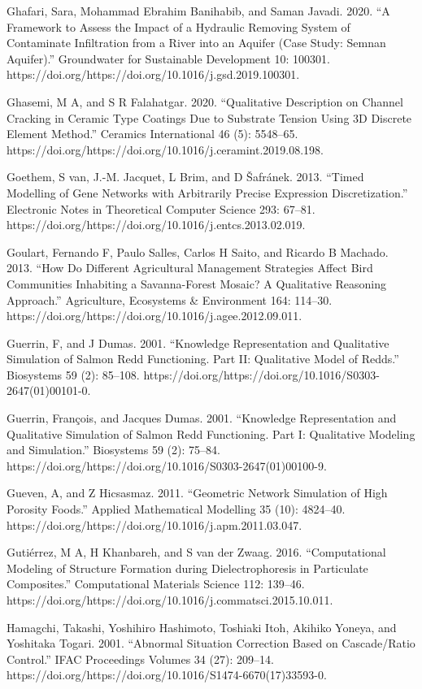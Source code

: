 \documentclass[utf8]{gradu3}
\begin{document}
Ghafari, Sara, Mohammad Ebrahim Banihabib, and Saman Javadi. 2020. “A Framework to Assess the Impact of a Hydraulic Removing System of Contaminate Infiltration from a River into an Aquifer (Case Study: Semnan Aquifer).” Groundwater for Sustainable Development 10: 100301. https://doi.org/https://doi.org/10.1016/j.gsd.2019.100301.

Ghasemi, M A, and S R Falahatgar. 2020. “Qualitative Description on Channel Cracking in Ceramic Type Coatings Due to Substrate Tension Using 3D Discrete Element Method.” Ceramics International 46 (5): 5548–65. https://doi.org/https://doi.org/10.1016/j.ceramint.2019.08.198.

Goethem, S van, J.-M. Jacquet, L Brim, and D Šafránek. 2013. “Timed Modelling of Gene Networks with Arbitrarily Precise Expression Discretization.” Electronic Notes in Theoretical Computer Science 293: 67–81. https://doi.org/https://doi.org/10.1016/j.entcs.2013.02.019.

Goulart, Fernando F, Paulo Salles, Carlos H Saito, and Ricardo B Machado. 2013. “How Do Different Agricultural Management Strategies Affect Bird Communities Inhabiting a Savanna-Forest Mosaic? A Qualitative Reasoning Approach.” Agriculture, Ecosystems \& Environment 164: 114–30. https://doi.org/https://doi.org/10.1016/j.agee.2012.09.011.

Guerrin, F, and J Dumas. 2001. “Knowledge Representation and Qualitative Simulation of Salmon Redd Functioning. Part II: Qualitative Model of Redds.” Biosystems 59 (2): 85–108. https://doi.org/https://doi.org/10.1016/S0303-2647(01)00101-0.

Guerrin, François, and Jacques Dumas. 2001. “Knowledge Representation and Qualitative Simulation of Salmon Redd Functioning. Part I: Qualitative Modeling and Simulation.” Biosystems 59 (2): 75–84. https://doi.org/https://doi.org/10.1016/S0303-2647(01)00100-9.

Gueven, A, and Z Hicsasmaz. 2011. “Geometric Network Simulation of High Porosity Foods.” Applied Mathematical Modelling 35 (10): 4824–40. https://doi.org/https://doi.org/10.1016/j.apm.2011.03.047.

Gutiérrez, M A, H Khanbareh, and S van der Zwaag. 2016. “Computational Modeling of Structure Formation during Dielectrophoresis in Particulate Composites.” Computational Materials Science 112: 139–46. https://doi.org/https://doi.org/10.1016/j.commatsci.2015.10.011.

Hamagchi, Takashi, Yoshihiro Hashimoto, Toshiaki Itoh, Akihiko Yoneya, and Yoshitaka Togari. 2001. “Abnormal Situation Correction Based on Cascade/Ratio Control.” IFAC Proceedings Volumes 34 (27): 209–14. https://doi.org/https://doi.org/10.1016/S1474-6670(17)33593-0.
\end{document}
